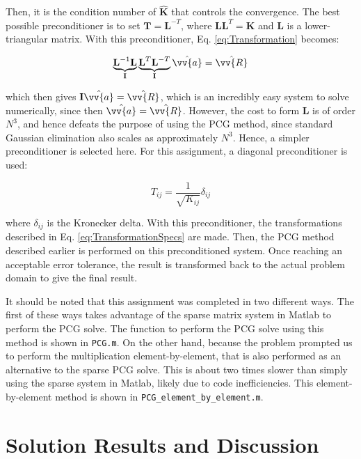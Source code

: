 \documentclass[10pt]{article}
\begin{document}
Then, it is the condition number of \(\hat{\textbf{K}}\) that controls the convergence. The best possible preconditioner is to set \(\textbf{T}=\textbf{L}^{-T}\), where \(\textbf{L}\textbf{L}^T=\textbf{K}\) and \textbf{L} is a lower-triangular matrix. With this preconditioner, Eq. \eqref{eq:Transformation} becomes:

\begin{equation}
\label{eq:Transformation2}
\underbrace{\textbf{L}^{-1}\textbf{L}}_\text{\textbf{I}}\underbrace{\textbf{L}^T\textbf{L}^{-T}}_\text{\textbf{I}}\hat{\vv{a}}=\hat{\vv{R}}
\end{equation}

which then gives \(\textbf{I}\hat{\vv{a}}=\hat{\vv{R}}\), which is an incredibly easy system to solve numerically, since then \(\hat{\vv{a}}=\hat{\vv{R}}\). However, the cost to form \(\textbf{L}\) is of order \(N^3\), and hence defeats the purpose of using the PCG method, since standard Gaussian elimination also scales as approximately \(N^3\). Hence, a simpler preconditioner is selected here. For this assignment, a diagonal preconditioner is used:

\begin{equation}
T_{ij}=\frac{1}{\sqrt{K_{ij}}}\delta_{ij}
\end{equation}

where \(\delta_{ij}\) is the Kronecker delta. With this preconditioner, the transformations described in Eq. \eqref{eq:TransformationSpecs} are made. Then, the PCG method described earlier is performed on this preconditioned system. Once reaching an acceptable error tolerance, the result is transformed back to the actual problem domain to give the final result.

It should be noted that this assignment was completed in two different ways. The first of these ways takes advantage of the sparse matrix system in Matlab to perform the PCG solve. The function to perform the PCG solve using this method is shown in \texttt{PCG.m}. On the other hand, because the problem prompted us to perform the multiplication element-by-element, that is also performed as an alternative to the sparse PCG solve. This is about two times slower than simply using the sparse system in Matlab, likely due to code inefficiencies. This element-by-element method is shown in \texttt{PCG\_element\_by\_element.m}.

\section{Solution Results and Discussion}
\end{document}
